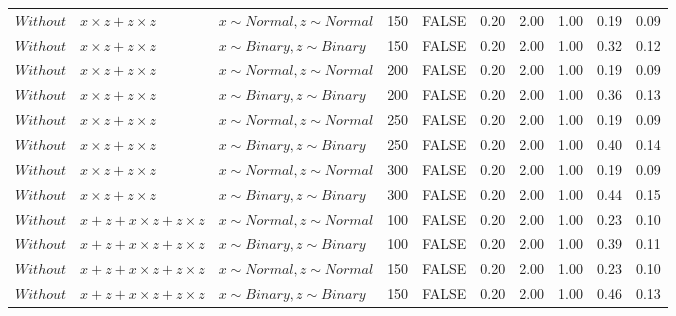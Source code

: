 \begin{longtable}{lllrlrrrrr}
  $Without$ & $\textit{x} \times \textit{z} + \textit{z} \times \textit{z}$ & $\textit{x} \sim Normal , \textit{z} \sim Normal$ & 150 & FALSE & 0.20 & 2.00 & 1.00 & 0.19 & 0.09 \\ 
  $Without$ & $\textit{x} \times \textit{z} + \textit{z} \times \textit{z}$ & $\textit{x} \sim Binary, \textit{z} \sim Binary$ & 150 & FALSE & 0.20 & 2.00 & 1.00 & 0.32 & 0.12 \\ 
  $Without$ & $\textit{x} \times \textit{z} + \textit{z} \times \textit{z}$ & $\textit{x} \sim Normal , \textit{z} \sim Normal$ & 200 & FALSE & 0.20 & 2.00 & 1.00 & 0.19 & 0.09 \\ 
  $Without$ & $\textit{x} \times \textit{z} + \textit{z} \times \textit{z}$ & $\textit{x} \sim Binary, \textit{z} \sim Binary$ & 200 & FALSE & 0.20 & 2.00 & 1.00 & 0.36 & 0.13 \\ 
  $Without$ & $\textit{x} \times \textit{z} + \textit{z} \times \textit{z}$ & $\textit{x} \sim Normal , \textit{z} \sim Normal$ & 250 & FALSE & 0.20 & 2.00 & 1.00 & 0.19 & 0.09 \\ 
  $Without$ & $\textit{x} \times \textit{z} + \textit{z} \times \textit{z}$ & $\textit{x} \sim Binary, \textit{z} \sim Binary$ & 250 & FALSE & 0.20 & 2.00 & 1.00 & 0.40 & 0.14 \\ 
  $Without$ & $\textit{x} \times \textit{z} + \textit{z} \times \textit{z}$ & $\textit{x} \sim Normal , \textit{z} \sim Normal$ & 300 & FALSE & 0.20 & 2.00 & 1.00 & 0.19 & 0.09 \\ 
  $Without$ & $\textit{x} \times \textit{z} + \textit{z} \times \textit{z}$ & $\textit{x} \sim Binary, \textit{z} \sim Binary$ & 300 & FALSE & 0.20 & 2.00 & 1.00 & 0.44 & 0.15 \\ 
  $Without$ & $\textit{x} + \textit{z} + \textit{x} \times \textit{z} + \textit{z} \times \textit{z}$ & $\textit{x} \sim Normal , \textit{z} \sim Normal$ & 100 & FALSE & 0.20 & 2.00 & 1.00 & 0.23 & 0.10 \\ 
  $Without$ & $\textit{x} + \textit{z} + \textit{x} \times \textit{z} + \textit{z} \times \textit{z}$ & $\textit{x} \sim Binary, \textit{z} \sim Binary$ & 100 & FALSE & 0.20 & 2.00 & 1.00 & 0.39 & 0.11 \\ 
  $Without$ & $\textit{x} + \textit{z} + \textit{x} \times \textit{z} + \textit{z} \times \textit{z}$ & $\textit{x} \sim Normal , \textit{z} \sim Normal$ & 150 & FALSE & 0.20 & 2.00 & 1.00 & 0.23 & 0.10 \\ 
  $Without$ & $\textit{x} + \textit{z} + \textit{x} \times \textit{z} + \textit{z} \times \textit{z}$ & $\textit{x} \sim Binary, \textit{z} \sim Binary$ & 150 & FALSE & 0.20 & 2.00 & 1.00 & 0.46 & 0.13 \\ 

\end{longtable}
